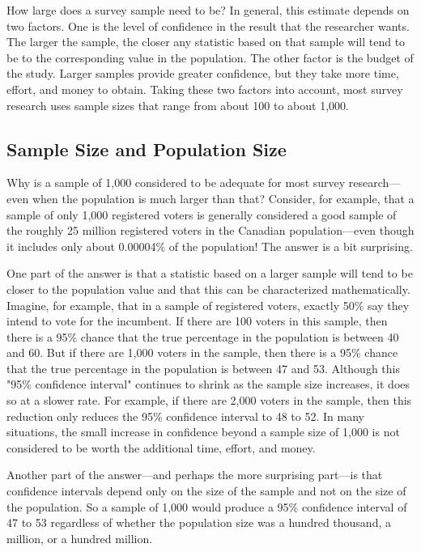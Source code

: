 How large does a survey sample need to be? In general, this estimate depends on two factors. One is the level of confidence in the result that the researcher wants. The larger the sample, the closer any statistic based on that sample will tend to be to the corresponding value in the population. The other factor is the budget of the study. Larger samples provide greater confidence, but they take more time, effort, and money to obtain. Taking these two factors into account, most survey research uses sample sizes that range from about 100 to about 1,000.

\subsection{Sample Size and Population Size}

Why is a sample of 1,000 considered to be adequate for most survey research---even when the population is much larger than that? Consider, for example, that a sample of only 1,000 registered voters is generally considered a good sample of the roughly 25 million registered voters in the Canadian population---even though it includes only about 0.00004\% of the population! The answer is a bit surprising.

One part of the answer is that a statistic based on a larger sample will tend to be closer to the population value and that this can be characterized mathematically. Imagine, for example, that in a sample of registered voters, exactly 50\% say they intend to vote for the incumbent. If there are 100 voters in this sample, then there is a 95\% chance that the true percentage in the population is between 40 and 60. But if there are 1,000 voters in the sample, then there is a 95\% chance that the true percentage in the population is between 47 and 53. Although this "95\% confidence interval" continues to shrink as the sample size increases, it does so at a slower rate. For example, if there are 2,000 voters in the sample, then this reduction only reduces the 95\% confidence interval to 48 to 52. In many situations, the small increase in confidence beyond a sample size of 1,000 is not considered to be worth the additional time, effort, and money.

Another part of the answer---and perhaps the more surprising part---is that confidence intervals depend only on the size of the sample and not on the size of the population. So a sample of 1,000 would produce a 95\% confidence interval of 47 to 53 regardless of whether the population size was a hundred thousand, a million, or a hundred million.


